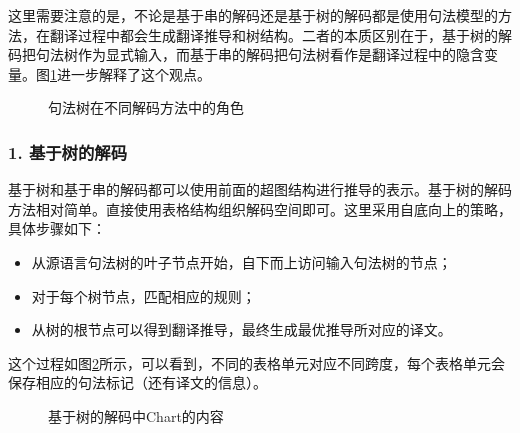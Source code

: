 \parinterval 这里需要注意的是，不论是基于串的解码还是基于树的解码都是使用句法模型的方法，在翻译过程中都会生成翻译推导和树结构。二者的本质区别在于，基于树的解码把句法树作为显式输入，而基于串的解码把句法树看作是翻译过程中的隐含变量。图\ref{fig:8-40}进一步解释了这个观点。

\begin{figure}[htp]
\centering

\setlength{\abovecaptionskip}{-0.5em}
\caption{句法树在不同解码方法中的角色}
\label{fig:8-40}
\end{figure}


\subsubsection{1. 基于树的解码}

\parinterval 基于树和基于串的解码都可以使用前面的超图结构进行推导的表示。基于树的解码方法相对简单。直接使用表格结构组织解码空间即可。这里采用自底向上的策略，具体步骤如下：
\begin{itemize}
\vspace{0.5em}
\item 从源语言句法树的叶子节点开始，自下而上访问输入句法树的节点；
\vspace{0.5em}
\item 对于每个树节点，匹配相应的规则；
\vspace{0.5em}
\item 从树的根节点可以得到翻译推导，最终生成最优推导所对应的译文。
\vspace{0.5em}
\end{itemize}

\parinterval 这个过程如图\ref{fig:8-41}所示，可以看到，不同的表格单元对应不同跨度，每个表格单元会保存相应的句法标记（还有译文的信息）。

\begin{figure}[htp]
\centering

\setlength{\abovecaptionskip}{-0.5em}
\caption{基于树的解码中Chart的内容}
\label{fig:8-41}
\end{figure}

